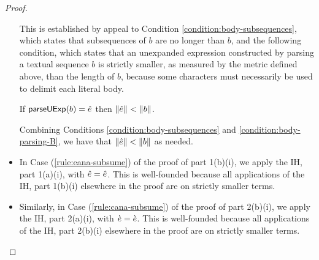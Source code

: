 \begin{proof}
\begin{itemize}
This is established by appeal to Condition \ref{condition:body-subsequences}, which states that subsequences of $b$ are no longer than $b$, and the following condition, which states that an unexpanded expression constructed by parsing a textual sequence $b$ is strictly smaller, as measured by the metric defined above, than the length of $b$, because some characters must necessarily be used to delimit each literal body.
\begin{condition}\label{condition:body-parsing-B} If $\mathsf{parseUExp}(b)={\hat e}$ then $\Vert {\hat e} \Vert < \Vert b \Vert$.\end{condition}

Combining Conditions \ref{condition:body-subsequences} and \ref{condition:body-parsing-B}, we have that $\Vert {\hat e} \Vert < \Vert b \Vert$ as needed.
\item In Case (\ref{rule:eana-subsume}) of the proof of part 1(b)(i), we apply the IH, part 1(a)(i), with ${\hat e}={\hat e}$. This is well-founded because all applications of the IH, part 1(b)(i) elsewhere in the proof are on strictly smaller terms.
\item Similarly, in Case (\ref{rule:cana-subsume}) of the proof of part 2(b)(i), we apply the IH, part 2(a)(i), with $\grave{e}=\grave{e}$. This is well-founded because all applications of the IH, part 2(b)(i) elsewhere in the proof are on strictly smaller terms.
\end{itemize}
\end{proof} 

